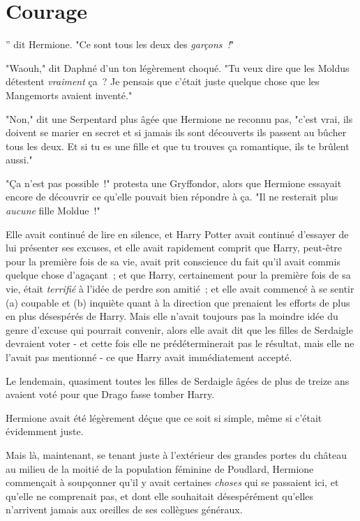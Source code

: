 \chapter{Courage}

” dit Hermione. "Ce sont tous les deux des \emph{garçons~!}"

\hplettrineextrapara
"Waouh," dit Daphné d'un ton légèrement choqué. "Tu veux dire que les Moldus détestent \emph{vraiment} ça~? Je pensais que c'était juste quelque chose que les Mangemorts avaient inventé."

"Non," dit une Serpentard plus âgée que Hermione ne reconnu pas, "c'est vrai, ils doivent se marier en secret et si jamais ils sont découverts ils passent au bûcher tous les deux. Et si tu es une fille et que tu trouves ça romantique, ils te brûlent aussi."

"Ça n'est pas possible~!" protesta une Gryffondor, alors que Hermione essayait encore de découvrir ce qu'elle pouvait bien répondre à ça. "Il ne resterait plus \emph{aucune} fille Moldue~!"

Elle avait continué de lire en silence, et Harry Potter avait continué d'essayer de lui présenter ses excuses, et elle avait rapidement comprit que Harry, peut-être pour la première fois de sa vie, avait prit conscience du fait qu'il avait commis quelque chose d'agaçant~; et que Harry, certainement pour la première fois de sa vie, était \emph{terrifié} à l'idée de perdre son amitié~; et elle avait commencé à se sentir (a) coupable et (b) inquiète quant à la direction que prenaient les efforts de plus en plus désespérés de Harry. Mais elle n'avait toujours pas la moindre idée du genre d'excuse qui pourrait convenir, alors elle avait dit que les filles de Serdaigle devraient voter - et cette fois elle ne prédéterminerait pas le résultat, mais elle ne l'avait pas mentionné - ce que Harry avait immédiatement accepté.

Le lendemain, quasiment toutes les filles de Serdaigle âgées de plus de treize ans avaient voté pour que Drago fasse tomber Harry.

Hermione avait été légèrement déçue que ce soit si simple, même si c'était évidemment juste.

Mais là, maintenant, se tenant juste à l'extérieur des grandes portes du château au milieu de la moitié de la population féminine de Poudlard, Hermione commençait à soupçonner qu'il y avait certaines \emph{choses} qui se passaient ici, et qu'elle ne comprenait pas, et dont elle souhaitait désespérément qu'elles n'arrivent jamais aux oreilles de ses collègues généraux.

